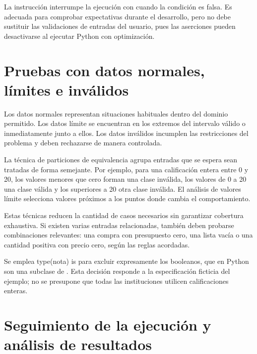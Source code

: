 

La instrucción  interrumpe la ejecución con  cuando la condición es falsa. Es adecuada para comprobar expectativas durante el desarrollo, pero no debe sustituir las validaciones de entradas del usuario, pues las aserciones pueden desactivarse al ejecutar Python con optimización.

\section{Pruebas con datos normales, límites e inválidos}

Los datos normales representan situaciones habituales dentro del dominio permitido. Los datos límite se encuentran en los extremos del intervalo válido o inmediatamente junto a ellos. Los datos inválidos incumplen las restricciones del problema y deben rechazarse de manera controlada.

La técnica de particiones de equivalencia agrupa entradas que se espera sean tratadas de forma semejante. Por ejemplo, para una calificación entera entre 0 y 20, los valores menores que cero forman una clase inválida, los valores de 0 a 20 una clase válida y los superiores a 20 otra clase inválida. El análisis de valores límite selecciona valores próximos a los puntos donde cambia el comportamiento.

Estas técnicas reducen la cantidad de casos necesarios sin garantizar cobertura exhaustiva. Si existen varias entradas relacionadas, también deben probarse combinaciones relevantes: una compra con presupuesto cero, una lista vacía o una cantidad positiva con precio cero, según las reglas acordadas.




Se emplea type(nota) is  para excluir expresamente los booleanos, que en Python son una subclase de . Esta decisión responde a la especificación ficticia del ejemplo; no se presupone que todas las instituciones utilicen calificaciones enteras.

\section{Seguimiento de la ejecución y análisis de resultados}

